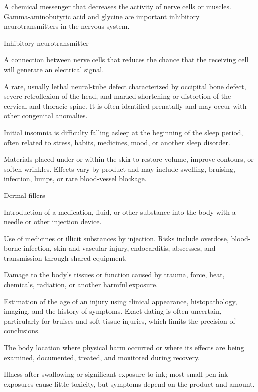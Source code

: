  A chemical messenger that decreases the activity of nerve cells or muscles. Gamma-aminobutyric acid and glycine are important inhibitory neurotransmitters in the nervous system.

\synonyms
Inhibitory neurotransmitter

 A connection between nerve cells that reduces the chance that the receiving cell will generate an electrical signal.

 A rare, usually lethal neural-tube defect characterized by occipital bone defect, severe
retroflexion of the head, and marked shortening or distortion of the cervical and
thoracic spine. It is often identified prenatally and may occur with other congenital
anomalies.

 Initial insomnia is difficulty falling asleep at the beginning of the sleep period, often related to stress, habits, medicines, mood, or another sleep disorder.

 Materials placed under or within the skin to restore volume, improve contours, or soften wrinkles. Effects vary by product and may include swelling, bruising, infection, lumps, or rare blood-vessel blockage.

\synonyms
Dermal fillers

 Introduction of a medication, fluid, or other substance into the body with a needle or other injection device.

 Use of medicines or illicit substances by injection. Risks include overdose, blood-borne infection, skin and vascular injury, endocarditis, abscesses, and transmission through shared equipment.

 Damage to the body's tissues or function caused by trauma, force, heat, chemicals, radiation, or another harmful exposure.

 Estimation of the age of an injury using clinical appearance, histopathology, imaging,
and the history of symptoms. Exact dating is often uncertain, particularly for bruises
and soft-tissue injuries, which limits the precision of conclusions.

 The body location where physical harm occurred or where its effects are being examined, documented, treated, and monitored during recovery.

 Illness after swallowing or significant exposure to ink; most small pen-ink exposures cause little toxicity, but symptoms depend on the product and amount.

